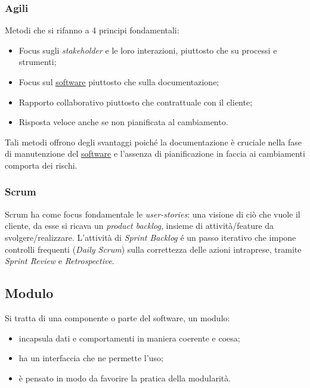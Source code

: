 		\subsubsection{Agili}
		Metodi che si rifanno a 4 principi fondamentali:
			\begin{itemize}
			\item Focus sugli \emph{stakeholder} e le loro interazioni, piuttosto che su processi e strumenti;
			\item Focus sul \underline{\hyperref[sec:prodottosoftware]{software}} piuttosto che sulla documentazione;
			\item Rapporto collaborativo piuttosto che contrattuale con il cliente;
			\item Risposta veloce anche se non pianificata al cambiamento.
			\end{itemize}
		Tali metodi offrono degli svantaggi poiché la documentazione è cruciale nella fase di manutenzione del \underline{\hyperref[sec:prodottosoftware]{software}} e l'assenza di pianificazione in faccia ai cambiamenti comporta dei rischi.

			\subsubsection{Scrum}
				Scrum ha come focus fondamentale le  \emph{user-stories}: una visione di ciò che vuole il cliente, da esse si ricava un \emph{product backlog}, insieme di attività/feature da svolgere/realizzare. L'attività di \emph{Sprint Backlog} é un passo iterativo che impone controlli frequenti (\emph{Daily Scrum}) sulla correttezza delle azioni intraprese, tramite \emph{Sprint Review} e \emph{Retrospective}.
				
	\subsection{Modulo}
	\label{sec:modulo}
	Si tratta di una componente o parte del software, un modulo:
	\begin{itemize}
	\item incapsula dati e comportamenti in maniera coerente e coesa;
	\item ha un interfaccia che ne permette l'uso;
	\item è pensato in modo da favorire la pratica della modularità.
	\end{itemize}
	
